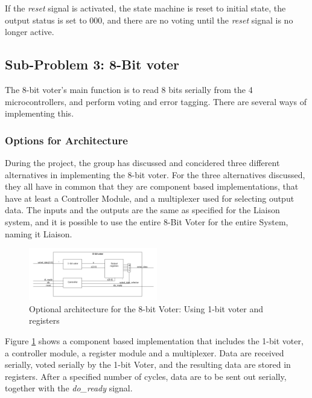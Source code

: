 \documentclass[a4paper]{IEEEtran}
\begin{document}
If the \textit{reset} signal is activated, the state machine is reset to initial state, the output status is set to 000, and there are no voting until the \textit{reset} signal is no longer active. 

\subsection{Sub-Problem 3: 8-Bit voter}

The 8-bit voter's main function is to read 8 bits serially from the 4 microcontrollers, and perform voting and error tagging. 
There are several ways of implementing this.

\subsubsection{Options for Architecture}
During the project, the group has discussed and concidered three different alternatives in implementing the 8-bit voter.
For the three alternatives discussed, they all have in common that they are component based implementations, that have at least a Controller Module, and a multiplexer used for selecting output data.
The inputs and the outputs are the same as specified for the Liaison system, and it is possible to use the entire 8-Bit Voter for the entire System, naming it Liaison. 

\begin{figure}[h!]
    \centering
    \includegraphics[width=0.5\textwidth]{Figures/Solution/ArchitectureOption1}
    \caption{Optional architecture for the 8-bit Voter: Using 1-bit voter and registers}
    \label{fig:ArchitectureOption1}
\end{figure}
Figure \ref{fig:ArchitectureOption1} shows a component based implementation that includes the 1-bit voter, a controller module, a register module and a multiplexer. Data are received serially, voted serially by the 1-bit Voter, and the resulting data are stored in registers. After a specified number of cycles, data are to be sent out serially, together with the \textit{do\_ready} signal.
\end{document}

